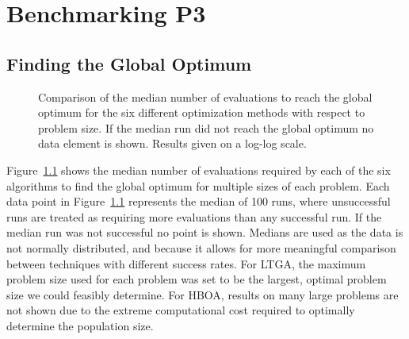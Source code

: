 \chapter{Benchmarking P3}
\label{chap-benchmarking}

\section{Finding the Global Optimum}
\label{sec-optimum}

\begin{figure}
  \begin{center}
  \end{center}
  \caption{Comparison of the median number of evaluations to reach the global optimum for
           the six different optimization methods with respect
           to problem size.  If the median run did not reach the global optimum no data element
           is shown.  Results given on a log-log scale.}
  \label{fig-evals-to-success}
\end{figure}

Figure~\ref{fig-evals-to-success} shows the median number of evaluations required by each of the six
algorithms to find the global optimum for multiple sizes of each problem. Each data point in
Figure~\ref{fig-evals-to-success} represents the median of 100 runs, where unsuccessful runs
are treated as requiring more evaluations than any successful run. If the median run was not successful
no point is shown.
Medians are used as the data is not normally distributed, and because it allows for more meaningful comparison
between techniques with different success rates.
For LTGA, the
maximum problem size used for each problem was set to be the largest, %
optimal problem
size we could
feasibly determine.
For HBOA,
results on many large problems are not shown due to the extreme
computational cost required to optimally 
determine the population size. 

